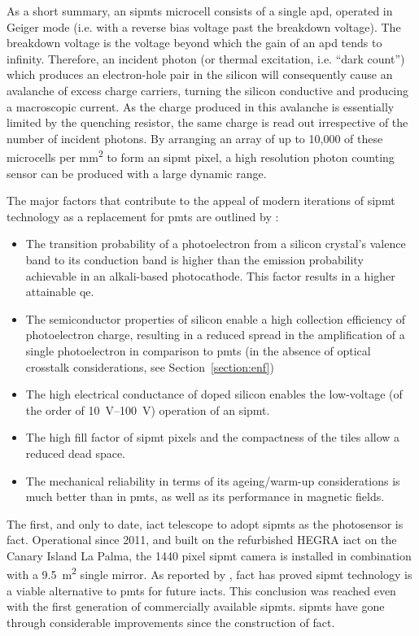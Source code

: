 As a short summary, an \glspl{sipmt} microcell consists of a single \gls{apd}, operated in Geiger mode (i.e. with a reverse bias voltage past the breakdown voltage). The breakdown voltage is the voltage beyond which the gain of an \gls{apd} tends to infinity. Therefore, an incident photon (or thermal excitation, i.e. ``dark count'') which produces an electron-hole pair in the silicon will consequently cause an avalanche of excess charge carriers, turning the silicon conductive and producing a macroscopic current. As the charge produced in this avalanche is essentially limited by the quenching resistor, the same charge is read out irrespective of the number of incident photons. By arranging an array of up to 10,000 of these microcells per \si{mm\squared} to form an \gls{sipmt} pixel, a high resolution photon counting sensor can be produced with a large dynamic range.

The major factors that contribute to the appeal of modern iterations of \gls{sipmt} technology as a replacement for \glspl{pmt} are outlined by \textcite{Ghassemi2017}:
\begin{itemize}
\item The transition probability of a photoelectron from a silicon crystal’s valence band to its conduction band is higher than the emission probability achievable in an alkali-based photocathode. This factor results in a higher attainable \gls{qe}. 
\item The semiconductor properties of silicon enable a high collection efficiency of photoelectron charge, resulting in a reduced spread in the amplification of a single photoelectron in comparison to \glspl{pmt} (in the absence of optical crosstalk considerations, see Section~\ref{section:enf})
\item The high electrical conductance of doped silicon enables the low-voltage (of the order of \SIrange{10}{100}{V}) operation of an \gls{sipmt}.
\item The high fill factor of \gls{sipmt} pixels and the compactness of the tiles allow a reduced dead space.
\item The mechanical reliability in terms of its ageing/warm-up considerations is much better than in \glspl{pmt}, as well as its performance in magnetic fields.
\end{itemize}

The first, and only to date, \gls{iact} telescope to adopt \glspl{sipmt} as the photosensor is \gls{fact}. Operational since 2011, and built on the refurbished
HEGRA \gls{iact} on the Canary Island La Palma, the 1440 pixel \gls{sipmt} camera is installed in combination with a \SI{9.5}{m\squared} single mirror. As reported by \textcite{Biland2015}, \gls{fact} has proved \gls{sipmt} technology is a viable alternative to \glspl{pmt} for future \glspl{iact}. This conclusion was reached even with the first generation of commercially available \glspl{sipmt}. \glspl{sipmt} have gone through considerable improvements since the construction of \gls{fact}.

